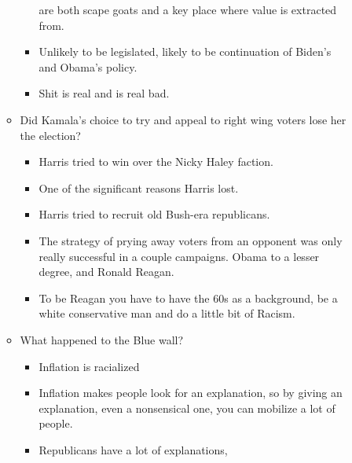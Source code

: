 \documentclass{report}
\begin{document}
\begin{description}
\begin{itemize}
\begin{itemize}
\begin{itemize}
                                are both scape goats and a key
                                place where value is extracted
                                from.
                            \item Unlikely to be legislated,
                                likely to be continuation of
                                Biden's and Obama's policy.
                            \item Shit is real and is real bad.
                        \end{itemize}
                    \item Did Kamala's choice to try and appeal
                        to right wing voters lose her the
                        election?
                        \begin{itemize}
                            \item Harris tried to win over
                                the Nicky Haley faction.
                            \item One of the significant reasons
                                Harris lost.
                            \item Harris tried to recruit
                                old Bush-era republicans.
                            \item The strategy of prying away
                                voters from an opponent was only
                                really successful in a couple
                                campaigns. Obama to a lesser
                                degree, and Ronald Reagan.
                            \item To be Reagan you have to
                                have the 60s as a background,
                                be a white conservative man
                                and do a little bit of Racism.
                        \end{itemize}

                    \item What happened to the Blue wall?
                        \begin{itemize}
                            \item Inflation is racialized
                            \item Inflation makes people look
                                for an explanation, so by
                                giving an explanation, even
                                a nonsensical one, you can
                                mobilize a lot of people.
                            \item Republicans have a lot of
                                explanations,


\end{itemize}
\end{itemize}
\end{itemize}
\end{description}
\end{document}
